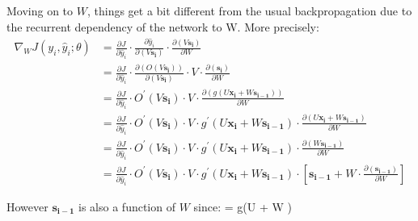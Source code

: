 Moving on to $W$, things get a bit different from the usual backpropagation due to the recurrent dependency of the
network to W. More precisely:
{\setlength{\jot}{5pt}
\begin{align*}
\nabla_W J(y_i, \hat{y}_i ; \theta)& = \frac{\partial J}{\partial \hat{y}_i}
\cdot \frac{\partial \hat{y}_i}{\partial (V \boldsymbol{s_i})} \cdot \frac{\partial (V\boldsymbol{s_i})}{\partial W} \\
&= \frac{\partial J}{\partial \hat{y}_i} \cdot \frac{ \partial ( O(V\boldsymbol{s_i}))}{\partial (V\boldsymbol{s_i})}
\cdot V \cdot \frac{\partial (\boldsymbol{s_{i}})} {\partial W} \\
&= \frac{\partial J}{\partial \hat{y}_i} \cdot O^\prime(V\boldsymbol{s_i})
\cdot V \cdot \frac{\partial (g(U \boldsymbol{x_i} + W \boldsymbol{s_{i-1}}))} {\partial W} \\
&= \frac{\partial J}{\partial \hat{y}_i} \cdot O^\prime(V \boldsymbol{s_i})
\cdot V \cdot g^\prime(U \boldsymbol{x_i} + W \boldsymbol{s_{i-1}})
\cdot \frac{\partial (U\boldsymbol{x_i} + W \boldsymbol{s_{i-1}})} {\partial W} \\
& = \frac{\partial J}{\partial \hat{y}_i} \cdot O^\prime(V\boldsymbol{s_i})
\cdot V \cdot g^\prime(U \boldsymbol{x_i} + W \boldsymbol{s_{i-1}})
\cdot \frac{\partial (W\boldsymbol{s_{i-1}})} {\partial W} \\
& = \frac{\partial J}{\partial \hat{y}_i} \cdot O^\prime(V \boldsymbol{s_i})
\cdot V \cdot g^\prime(U \boldsymbol{x_i} + W \boldsymbol{s_{i-1}})
\cdot \left[ \boldsymbol{s_{i-1}} + W \cdot \frac{\partial(\boldsymbol{s_{i-1}})} {\partial W} \right]
\end{align*}}

However $\boldsymbol{s_{i-1}}$ is also a function of $W$ since:
\bse
{}= g(U  + W )
\ese

